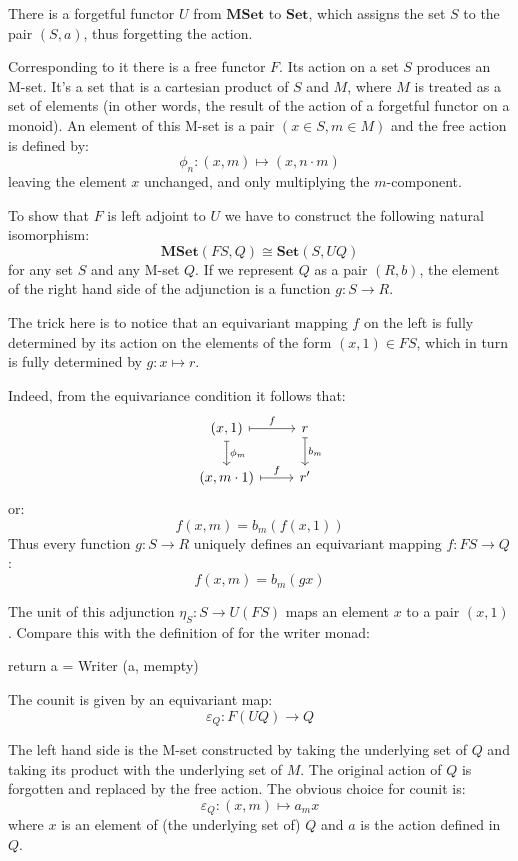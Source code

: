 \documentclass[DaoFP]{subfiles}
\begin{document}
There is a forgetful functor $U$ from $\mathbf{MSet}$ to $\mathbf{Set}$, which assigns the set $S$ to the pair $(S, a)$, thus forgetting the action.  

Corresponding to it there is a free functor $F$. Its action on a set $S$ produces an M-set. It's a set that is a cartesian product of $S$ and $M$, where $M$ is treated as a set of elements (in other words, the result of the action of a forgetful functor on a monoid). An element of this M-set is a pair $(x \in S, m \in M)$ and the free action is defined by:
\[ \phi_n \colon (x, m) \mapsto (x, n \cdot m) \]
leaving the element $x$ unchanged, and only multiplying the $m$-component.

To show that $F$ is left adjoint to $U$ we have to construct the following natural isomorphism:
\[ \mathbf{MSet}( F S, Q) \cong \mathbf{Set}(S, U Q) \]
for any set $S$ and any M-set $Q$. If we represent $Q$ as a pair $(R, b)$, the element of the right hand side of the adjunction is a function $g \colon S \to R$. 

The trick here is to notice that an equivariant mapping $f$ on the left is fully determined by its action on the elements of the form $(x, 1) \in F S$, which in turn is fully determined by $g \colon x \mapsto r$. 

Indeed, from the equivariance condition it follows that:
\[
 \begin{tikzcd}
 (x, 1)
 \arrow[r, mapsto, "f"]
 \arrow[d, mapsto, "\phi_m"]
 & r
\arrow[d, mapsto, "b_m"]
 \\
(x, m \cdot 1)
 \arrow[r, mapsto, "f"]
 & r'
  \end{tikzcd}
\]
or:
\[ f (x, m) = b_m ( f (x, 1)) \]
Thus every function $g \colon S \to R$ uniquely defines an equivariant mapping $f \colon F S \to Q$:
\[ f (x, m) = b_m (g x) \]

The unit of this adjunction $\eta_S \colon S \to U (F S)$ maps an element $x$ to a pair $(x, 1)$. Compare this with the definition of  for the writer monad:
\begin{haskell}
return a = Writer (a, mempty)
\end{haskell}

The counit is given by an equivariant map:
\[ \varepsilon_Q \colon F (U Q) \to Q \]

The left hand side is the M-set constructed by taking the underlying set of $Q$ and taking its product with the underlying set of $M$. The original action of $Q$ is forgotten and replaced by the free action. The obvious choice for counit is:
\[ \varepsilon_Q \colon (x, m) \mapsto a_m x \]
where $x$ is an element of (the underlying set of) $Q$ and $a$ is the action defined in $Q$.
\end{document}
